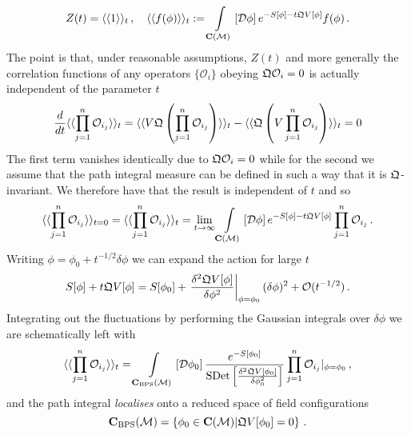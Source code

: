\documentclass[main.tex]{subfiles}
\begin{document}
\begin{equation}
Z(t)=\langle\langle 1\rangle\rangle_t\,,\quad \langle\langle f(\phi)\rangle\rangle_t:=\int\displaylimits_{\mathbf{C}(\mathcal{M})}\left[\mathcal{D}\phi\right]e^{-S[\phi]-t\mathfrak{Q} V[\phi]}f(\phi)\,.
\end{equation}
The point is that, under reasonable assumptions, $Z(t)$ and more generally the correlation functions of any operators $\{\mathcal{O}_i\}$ obeying $\mathfrak{Q}\mathcal{O}_i=0$ is actually independent of the parameter $t$
\begin{equation}
\frac{d}{d t}\langle\langle \prod_{j=1}^n\mathcal{O}_{i_j}\rangle\rangle_t= \langle\langle V\mathfrak{Q}\left(\prod_{j=1}^n\mathcal{O}_{i_j}\right)\rangle\rangle_t-\langle\langle \mathfrak{Q}\left(V\prod_{j=1}^n\mathcal{O}_{i_j}\right)\rangle\rangle_t=0
\end{equation}
The first term vanishes identically due to $\mathfrak{Q}\mathcal{O}_i=0$ while for the second we assume that the path integral measure can be defined in such a way that it is $\mathfrak{Q}$-invariant.  We therefore have that the result is independent of $t$ and so
\begin{equation}\label{eqn:locintegral}
\langle\langle \prod_{j=1}^n\mathcal{O}_{i_j}\rangle\rangle_{t=0}=\langle\langle \prod_{j=1}^n\mathcal{O}_{i_j}\rangle\rangle_t=\lim_{t\to\infty}\int\displaylimits_{\mathbf{C}(\mathcal{M})}\left[\mathcal{D}\phi\right]e^{-S[\phi]-t\mathfrak{Q} V[\phi]}\prod_{j=1}^n\mathcal{O}_{i_j}\,.
\end{equation}
Writing $\phi=\phi_0+t^{-1/2}\delta\phi$ we can expand the action for large $t$
\begin{equation}
S[\phi]+t\mathfrak{Q} V[\phi]=S[\phi_0]+\left.\frac{\delta^2\mathfrak{Q} V[\phi]}{\delta \phi^2}\right|_{\phi=\phi_0}(\delta\phi)^2+\mathcal{O}(t^{-1/2})\,.
\end{equation}
Integrating out the fluctuations by performing the Gaussian integrals over $\delta\phi$ we are schematically left with
\begin{equation}
\langle\langle \prod_{j=1}^n\mathcal{O}_{i_j}\rangle\rangle_t=\int\displaylimits_{\mathbf{C}_{\text{BPS}}(\mathcal{M})}\left[\mathcal{D}\phi_0\right]\frac{e^{-S[\phi_0]}}{\operatorname{SDet}\left[\frac{\delta^2\mathfrak{Q} V[\phi_0]}{\delta \phi_0^2}\right]}\prod_{j=1}^n\mathcal{O}_{i_j}|_{\phi=\phi_0}\,,
\end{equation}
and the path integral \textit{localises} onto a reduced space of field configurations 
\begin{equation}
\mathbf{C}_{\text{BPS}}(\mathcal{M})=\left\{\phi_0\in\mathbf{C}(\mathcal{M})|\mathfrak{Q} V[\phi_0]=0\right \}\,.
\end{equation}
\end{document}
